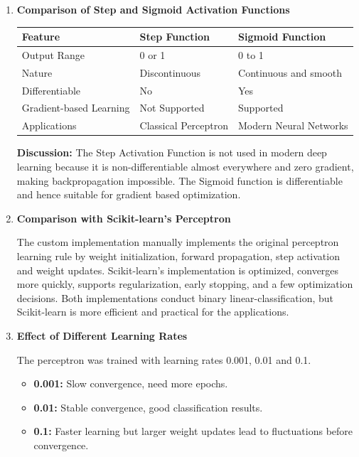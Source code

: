 \documentclass[11pt]{article}
\begin{document}
\begin{enumerate}[leftmargin=*]

\item \textbf{Comparison of Step and Sigmoid Activation Functions}

\begin{tabular}{|p{4cm}|p{5cm}|p{5cm}|}
\hline
\textbf{Feature} & \textbf{Step Function} & \textbf{Sigmoid Function} \\
\hline
Output Range & 0 or 1 & 0 to 1 \\
\hline
Nature & Discontinuous & Continuous and smooth \\
\hline
Differentiable & No & Yes \\
\hline
Gradient-based Learning & Not Supported & Supported \\
\hline
Applications & Classical Perceptron & Modern Neural Networks \\
\hline
\end{tabular}

\textbf{Discussion:}
The Step Activation Function is not used in modern deep learning because it is non-differentiable almost everywhere and zero gradient, making backpropagation impossible.
The Sigmoid function is differentiable and hence suitable for gradient based optimization.

\vspace{0.4cm}

\item \textbf{Comparison with Scikit-learn's Perceptron}

The custom implementation manually implements the original perceptron learning rule by  weight initialization, forward propagation, step activation and weight updates. Scikit-learn’s implementation is optimized, converges more quickly, supports regularization, early stopping, and a few optimization decisions. Both implementations conduct binary linear-classification, but Scikit-learn is more efficient and practical for the applications.

\vspace{0.4cm}

\item \textbf{Effect of Different Learning Rates}

The perceptron was trained with learning rates 0.001, 0.01 and 0.1.

\begin{itemize}
\item \textbf{0.001:} Slow convergence, need more epochs.
\item \textbf{0.01:} Stable convergence, good classification results.
\item \textbf{0.1:} Faster learning but larger weight updates lead to fluctuations before convergence.
\end{itemize}


\end{enumerate}
\end{document}
